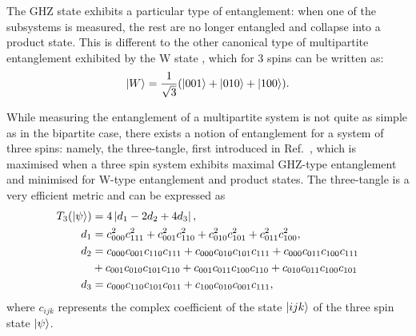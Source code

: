 The GHZ state exhibits a particular type of entanglement: when one of the subsystems is measured, the rest are no longer entangled and collapse into a product state. This is different to the other canonical type of multipartite entanglement exhibited by the W state \cite{cabello_bells_2002}, which for 3 spins can be written as:
\begin{equation}\label{eq:W_state}
    \ket{W} = \frac{1}{\sqrt{3}}(\ket{001} + \ket{010} + \ket{100}).
\end{equation}

While measuring the entanglement of a multipartite system is not quite as simple as in the bipartite case, there exists a notion of entanglement for a system of three spins: namely, the three-tangle, first introduced in Ref.~\cite{coffman_distributed_2000}, which is maximised when a three spin system exhibits maximal GHZ-type entanglement and minimised for W-type entanglement and product states. The three-tangle is a very efficient metric and can be expressed as
\begin{equation}\label{eq:3-tangle}
	\begin{aligned}
		T_3(\ket{\psi}) &= 4 \left| d_1 - 2 d_2 + 4 d_3 \right|, \\
		d_1 &= c^2_{000}c^2_{111} + c^2_{001}c^2_{110} + c^2_{010}c^2_{101} + c^2_{011}c^2_{100}, \\
		d_2 &= c_{000}c_{001}c_{110}c_{111} + c_{000}c_{010}c_{101}c_{111} + c_{000}c_{011}c_{100}c_{111} \\
		 &+ c_{001}c_{010}c_{101}c_{110} + c_{001}c_{011}c_{100}c_{110} + c_{010}c_{011}c_{100}c_{101} \\
		d_3 &= c_{000}c_{110}c_{101}c_{011} + c_{100}c_{010}c_{001}c_{111},
	\end{aligned}
\end{equation}
where $c_{ijk}$ represents the complex coefficient of the state $\ket{ijk}$ of the three spin state $\ket{\psi}$. 

